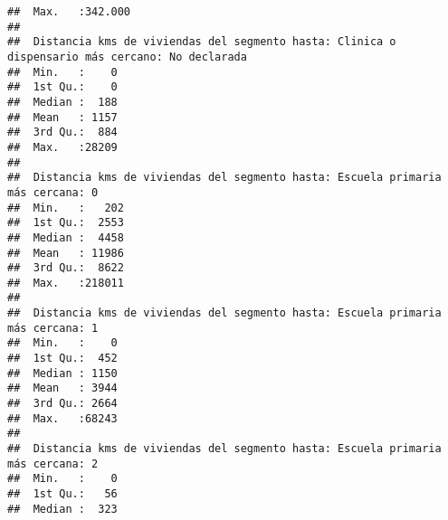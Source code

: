 \documentclass[11pt,]{article}
\begin{document}
\begin{verbatim}
##  Max.   :342.000                                                                     
##                                                                                      
##  Distancia kms de viviendas del segmento hasta: Clinica o dispensario más cercano: No declarada
##  Min.   :    0                                                                                 
##  1st Qu.:    0                                                                                 
##  Median :  188                                                                                 
##  Mean   : 1157                                                                                 
##  3rd Qu.:  884                                                                                 
##  Max.   :28209                                                                                 
##                                                                                                
##  Distancia kms de viviendas del segmento hasta: Escuela primaria más cercana: 0
##  Min.   :   202                                                                
##  1st Qu.:  2553                                                                
##  Median :  4458                                                                
##  Mean   : 11986                                                                
##  3rd Qu.:  8622                                                                
##  Max.   :218011                                                                
##                                                                                
##  Distancia kms de viviendas del segmento hasta: Escuela primaria más cercana: 1
##  Min.   :    0                                                                 
##  1st Qu.:  452                                                                 
##  Median : 1150                                                                 
##  Mean   : 3944                                                                 
##  3rd Qu.: 2664                                                                 
##  Max.   :68243                                                                 
##                                                                                
##  Distancia kms de viviendas del segmento hasta: Escuela primaria más cercana: 2
##  Min.   :    0                                                                 
##  1st Qu.:   56                                                                 
##  Median :  323                                                                 

\end{verbatim}
\end{document}
